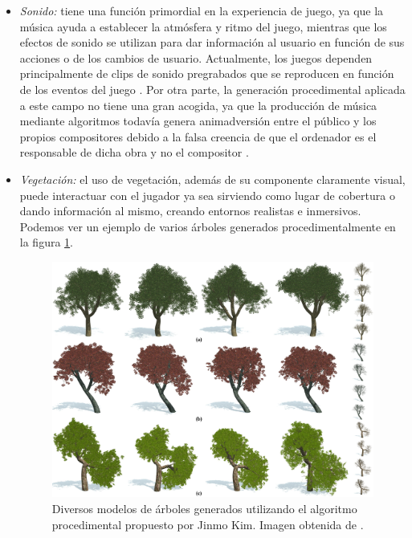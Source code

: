 \begin{enumerate}[label=(\alph*)]
\begin{itemize}
        \item \textit{Sonido:} tiene una función primordial en la experiencia de juego, ya que la música ayuda a establecer la atmósfera y ritmo del juego, mientras que los efectos de sonido se utilizan para dar información al usuario en función de sus acciones o de los cambios de usuario. Actualmente, los juegos dependen principalmente de clips de sonido pregrabados que se reproducen en función de los eventos del juego \cite{manocha2009}. Por otra parte, la generación procedimental aplicada a este campo no tiene una gran acogida, ya que la producción de música mediante algoritmos todavía genera animadversión entre el público y los propios compositores debido a la falsa creencia de que el ordenador es el responsable de dicha obra y no el compositor \cite{edwards2011}.
        \item \textit{Vegetación:} el uso de vegetación, además de su componente claramente visual, puede interactuar con el jugador ya sea sirviendo como lugar de cobertura o dando información al mismo, creando entornos realistas e inmersivos. Podemos ver un ejemplo de varios árboles generados procedimentalmente en la figura \ref{fig:arboles}.
        
        \begin{figure}[H]
            \begin{center}
                \includegraphics[scale=0.08]{img/tree-models.jpg}
                \caption{Diversos modelos de árboles generados utilizando el algoritmo procedimental propuesto por Jinmo Kim. Imagen obtenida de \cite{kim2016}.}
                \label{fig:arboles}
            \end{center}
        \end{figure}        
        

\end{itemize}
\end{enumerate}
